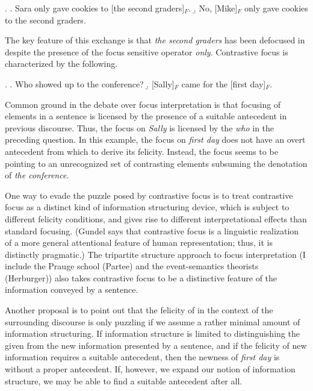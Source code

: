 \documentclass[10pt]{article}
\begin{document}
\ex. \a. Sara only gave cookies to [the second graders]$_F$.
\b. No, [Mike]$_F$ only gave cookies to the second graders.

The key feature of this exchange is that \textit{the second graders} has been defocused in \Last[b] despite the presence of the focus sensitive operator \textit{only}. Contrastive focus is characterized by the following.

\ex. \a. Who showed up to the conference?
\b. [Sally]$_F$ came for the [first day]$_F$.

Common ground in the debate over focus interpretation is that focusing of elements in a sentence is licensed by the presence of a suitable antecedent in previous discourse.  Thus, the focus on \textit{Sally} is licensed by the \textit{who} in the preceding question.  In this example, the focus on \textit{first day} does not have an overt antecedent from which to derive its felicity.  Instead, the focus seems to be pointing to an unrecognized set of contrasting elements subsuming the denotation of \textit{the conference}.

One way to evade the puzzle posed by contrastive focus is to treat contrastive focus as a distinct kind of information structuring device, which is subject to different felicity conditions, and gives rise to different interpretational effects than standard focusing. (Gundel says that contrastive focus is a linguistic realization of a more general attentional feature of human representation; thus, it is distinctly pragmatic.)  The tripartite structure approach to focus interpretation (I include the Prauge school (Partee) and the event-semantics theorists (Herburger)) also takes contrastive focus to be a distinctive feature of the information conveyed by a sentence.  

Another proposal is to point out that the felicity of \Last[b] in the context of the surrounding discourse is only puzzling if we assume a rather minimal amount of information structuring.  If information structure is limited to distinguishing the given from the new information presented by a sentence, and if the felicity of new information requires a suitable antecedent, then the newness of \textit{first day} is without a proper antecedent.  If, however, we expand our notion of information structure, we may be able to find a suitable antecedent after all.
\end{document}
